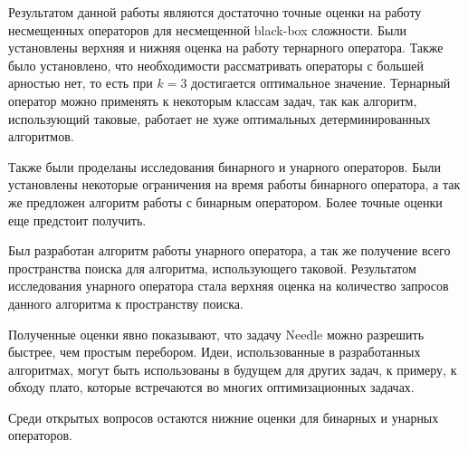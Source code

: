 \startconclusionpage

Результатом данной работы являются достаточно точные оценки на работу несмещенных операторов для несмещенной black-box сложности.
Были установлены верхняя и нижняя оценка на работу тернарного оператора. Также было установлено, что необходимости рассматривать операторы с большей арностью нет, то есть при $k = 3$ достигается 
оптимальное значение. Тернарный оператор можно применять к некоторым классам задач, так как алгоритм, использующий таковые, работает не хуже оптимальных детерминированных алгоритмов.  

Также были проделаны исследования бинарного и унарного операторов. Были установлены некоторые ограничения на время работы бинарного оператора, а так же предложен алгоритм работы с бинарным оператором. 
Более точные оценки еще предстоит получить.

Был разработан алгоритм работы унарного оператора, а так же получение всего пространства поиска для алгоритма, использующего таковой. 
Результатом исследования унарного оператора стала верхняя оценка на количество запросов данного алгоритма к пространству поиска. 

Полученные оценки явно показывают, что задачу Needle можно разрешить быстрее, чем простым перебором. Идеи, использованные в разработанных алгоритмах, могут быть использованы в будущем для других задач, 
к примеру, к обходу плато, которые встречаются во многих оптимизационных задачах.

Среди открытых вопросов остаются нижние оценки для бинарных и унарных операторов.
